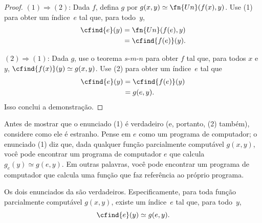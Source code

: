 \documentclass[../../../include/open-logic-section]{subfiles}
\begin{document}
\begin{proof}
$(1) \Rightarrow (2)$: Dada $f$, defina $g$ por
$g(x,y) \simeq \fn{Un}(f(x),y)$. Use (1) para obter um índice~$e$ tal
que, para todo~$y$,
\begin{align*}
\cfind{e}(y) & = \fn{Un}(f(e),y) \\
& = \cfind{f(e)}(y).
\end{align*}

$(2) \Rightarrow (1)$: Dada $g$, use o teorema $s$-$m$-$n$ para obter
$f$ tal que, para todos $x$ e~$y$,
$\cfind{f(x)}(y) \simeq g(x,y)$. Use (2) para obter um índice~$e$ tal
que
\begin{align*}
\cfind{e}(y) & = \cfind{f(e)}(y) \\
& = g(e,y).
\end{align*}
Isso conclui a demonstração.
\end{proof}

\begin{explain}
Antes de mostrar que o enunciado (1) é verdadeiro (e, portanto, (2)
também), considere como ele é estranho. Pense em $e$ como um programa
de computador; o enunciado (1) diz que, dada qualquer função
parcialmente computável $g(x,y)$, você pode encontrar um programa de
computador $e$ que calcula $g_e(y) \simeq g(e,y)$. Em outras palavras,
você pode encontrar um programa de computador que calcula uma função
que faz referência ao próprio programa.
\end{explain}

\begin{thm}
Os dois enunciados da  são
verdadeiros. Especificamente, para toda função parcialmente computável
$g(x,y)$, existe um índice~$e$ tal que, para todo~$y$,
\[
\cfind{e}(y) \simeq g(e,y).
\]
\end{thm}
\end{document}
